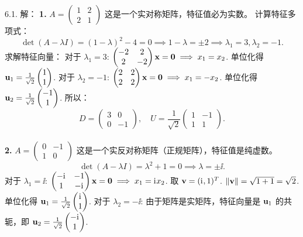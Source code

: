 \begin{exer}
\vspace{5ex}

6.1. 解：
\textbf{1. } $A = \begin{pmatrix} 1 & 2 \\ 2 & 1 \end{pmatrix}$
这是一个实对称矩阵，特征值必为实数。
计算特征多项式：
$$ \det(A - \lambda I) = (1-\lambda)^2 - 4 = 0 \implies 1-\lambda = \pm 2 \implies \lambda_1 = 3, \lambda_2 = -1. $$
求解特征向量：
对于 $\lambda_1 = 3$: $\begin{pmatrix} -2 & 2 \\ 2 & -2 \end{pmatrix} \mathbf{x} = \mathbf{0} \implies x_1 = x_2$. 单位化得 $\mathbf{u}_1 = \frac{1}{\sqrt{2}} \begin{pmatrix} 1 \\ 1 \end{pmatrix}$.
对于 $\lambda_2 = -1$: $\begin{pmatrix} 2 & 2 \\ 2 & 2 \end{pmatrix} \mathbf{x} = \mathbf{0} \implies x_1 = -x_2$. 单位化得 $\mathbf{u}_2 = \frac{1}{\sqrt{2}} \begin{pmatrix} -1 \\ 1 \end{pmatrix}$.
所以：
$$ D = \begin{pmatrix} 3 & 0 \\ 0 & -1 \end{pmatrix}, \quad U = \frac{1}{\sqrt{2}} \begin{pmatrix} 1 & -1 \\ 1 & 1 \end{pmatrix}. $$
\\
\textbf{2. } $A = \begin{pmatrix} 0 & -1 \\ 1 & 0 \end{pmatrix}$
这是一个实反对称矩阵（正规矩阵），特征值是纯虚数。
$$ \det(A - \lambda I) = \lambda^2 + 1 = 0 \implies \lambda = \pm \ii. $$
对于 $\lambda_1 = \ii$: $\begin{pmatrix} -\mathrm{i}\mkern1mu & -1 \\ 1 & -\mathrm{i}\mkern1mu \end{pmatrix} \mathbf{x} = \mathbf{0} \implies x_1 = \mathrm{i}\mkern1mu x_2$. 取 $\mathbf{v} = (\mathrm{i}\mkern1mu, 1)^T$. $\|\mathbf{v}\| = \sqrt{1+1} = \sqrt{2}$.
单位化得 $\mathbf{u}_1 = \frac{1}{\sqrt{2}} \begin{pmatrix} \mathrm{i}\mkern1mu \\ 1 \end{pmatrix}$.
对于 $\lambda_2 = -\ii$: 由于矩阵是实矩阵，特征向量是 $\mathbf{u}_1$ 的共轭，即 $\mathbf{u}_2 = \frac{1}{\sqrt{2}} \begin{pmatrix} -\mathrm{i}\mkern1mu \\ 1 \end{pmatrix}$.

\end{exer}
